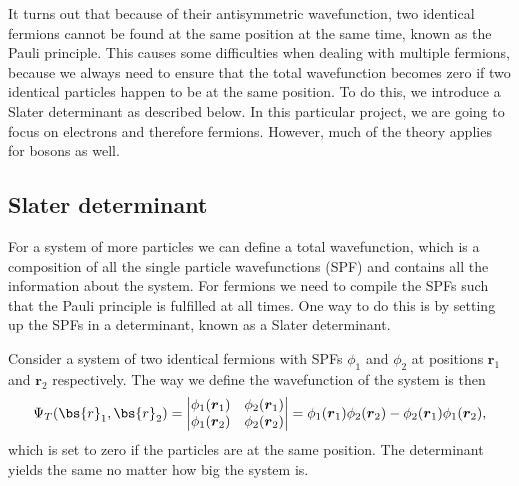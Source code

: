 It turns out that because of their antisymmetric wavefunction, two identical fermions cannot be found at the same position at the same time, known as the Pauli principle. This causes some difficulties when dealing with multiple fermions, because we always need to ensure that the total wavefunction becomes zero if two identical particles happen to be at the same position. To do this, we introduce a Slater determinant as described below. In this particular project, we are going to focus on electrons and therefore fermions. However, much of the theory applies for bosons as well.

\subsection{Slater determinant} \label{subsec:slater}
For a system of more particles we can define a total wavefunction, which is a composition of all the single particle wavefunctions (SPF) and contains all the information about the system. For fermions we need to compile the SPFs such that the Pauli principle is fulfilled at all times. One way to do this is by setting up the SPFs in a determinant, known as a Slater determinant.

Consider a system of two identical fermions with SPFs $\phi_1$ and $\phi_2$ at positions $\boldsymbol{r}_1$ and $\boldsymbol{r}_2$ respectively. The way we define the wavefunction of the system is then
\begin{equation}
\Psi_T(\bs{r}_1,\bs{r}_2)=
\begin{vmatrix}
\phi_1(\boldsymbol{r}_1) & \phi_2(\boldsymbol{r}_1)\\
\phi_1(\boldsymbol{r}_2) & \phi_2(\boldsymbol{r}_2)
\end{vmatrix}
=\phi_1(\boldsymbol{r}_1)\phi_2(\boldsymbol{r}_2)-\phi_2(\boldsymbol{r}_1)\phi_1(\boldsymbol{r}_2),
\end{equation}
which is set to zero if the particles are at the same position. The determinant yields the same no matter how big the system is.

